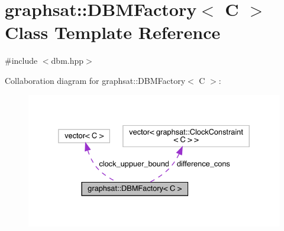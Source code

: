 \hypertarget{classgraphsat_1_1_d_b_m_factory}{}\section{graphsat\+::D\+B\+M\+Factory$<$ C $>$ Class Template Reference}
\label{classgraphsat_1_1_d_b_m_factory}


{\ttfamily \#include $<$dbm.\+hpp$>$}



Collaboration diagram for graphsat\+::D\+B\+M\+Factory$<$ C $>$\+:
\nopagebreak
\begin{figure}[H]
\begin{center}
\leavevmode
\includegraphics[width=332pt]{classgraphsat_1_1_d_b_m_factory__coll__graph}
\end{center}
\end{figure}
